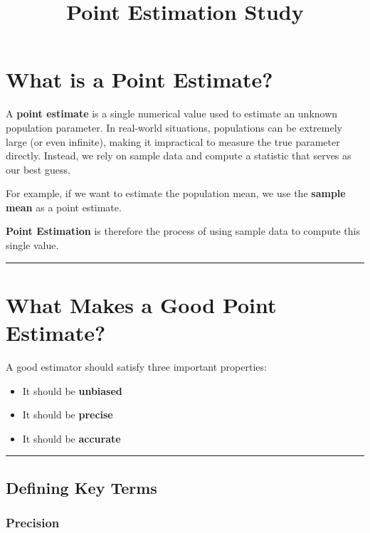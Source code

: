 \documentclass[
  letterpaper,
  DIV=11,
  numbers=noendperiod]{scrartcl}
\title{Point Estimation Study}
\author{}
\date{}
\providecommand{\tightlist}{%
  \setlength{\itemsep}{0pt}\setlength{\parskip}{0pt}}
\begin{document}
\maketitle


\section{What is a Point Estimate?}\label{what-is-a-point-estimate}

A \textbf{point estimate} is a single numerical value used to estimate
an unknown population parameter. In real-world situations, populations
can be extremely large (or even infinite), making it impractical to
measure the true parameter directly. Instead, we rely on sample data and
compute a statistic that serves as our best guess.

For example, if we want to estimate the population mean, we use the
\textbf{sample mean} as a point estimate.

\textbf{Point Estimation} is therefore the process of using sample data
to compute this single value.

\begin{center}\rule{0.5\linewidth}{0.5pt}\end{center}

\section{What Makes a Good Point
Estimate?}\label{what-makes-a-good-point-estimate}

A good estimator should satisfy three important properties:

\begin{itemize}
\tightlist
\item
  It should be \textbf{unbiased}
\item
  It should be \textbf{precise}
\item
  It should be \textbf{accurate}
\end{itemize}

\begin{center}\rule{0.5\linewidth}{0.5pt}\end{center}

\subsection{Defining Key Terms}\label{defining-key-terms}

\subsubsection{Precision}\label{precision}
\end{document}
